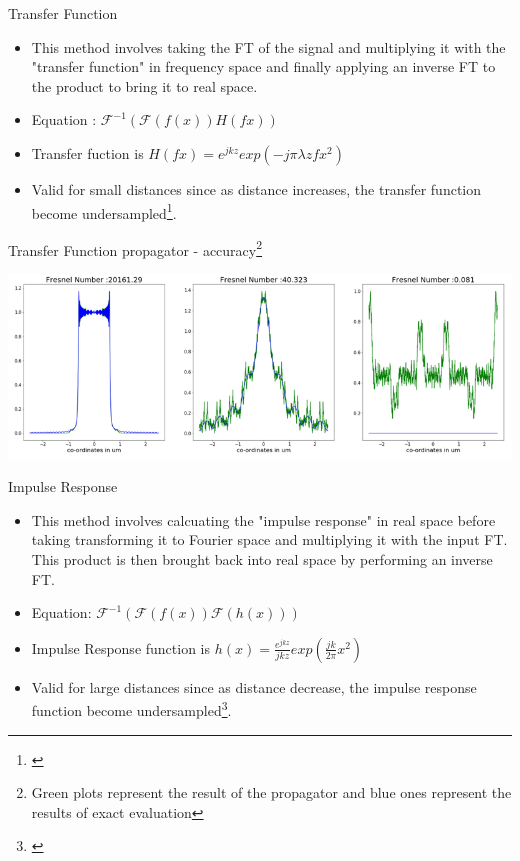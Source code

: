\documentclass{beamer}
\begin{document}
\begin{frame}{Transfer Function}
\begin{itemize}
	\item This method involves taking the FT of the signal and multiplying it with the "transfer function" in frequency space and finally applying an inverse FT to the product to bring it to real space. 
	\item Equation : $\mathcal{F}^{-1}(\mathcal{F}(f(x))H(fx))$
	\item Transfer fuction is $H(fx) = e^{jkz}exp(-j\pi\lambda z fx^{2})$
	\item Valid for small distances since as distance increases, the transfer function become undersampled\footnote{\cite{Voelz2009}}.
\end{itemize}
\end{frame}

\begin{frame}{Transfer Function propagator - accuracy\footnote{Green plots represent the result of the propagator and blue ones represent the results of exact evaluation }}
\begin{center}
	\includegraphics[scale=0.5]{tf}
\end{center}
\end{frame}

\begin{frame}{Impulse Response}
\begin{itemize}
	\item This method involves calcuating the "impulse response" in real space before taking transforming it to Fourier space and multiplying it with the input FT. This product is then brought back into real space by performing an inverse FT.
	\item Equation:
	$\mathcal{F}^{-1}(\mathcal{F}(f(x))\mathcal{F}(h(x)))$
	\item Impulse Response function is $h(x) = \frac{e^{jkz}}{jkz}exp(\frac{jk}{2\pi}x^{2})$
	\item Valid for large distances since as distance decrease, the impulse response function become undersampled\footnote{\cite{Voelz2009}}.
\end{itemize}
\end{frame}
\end{document}
